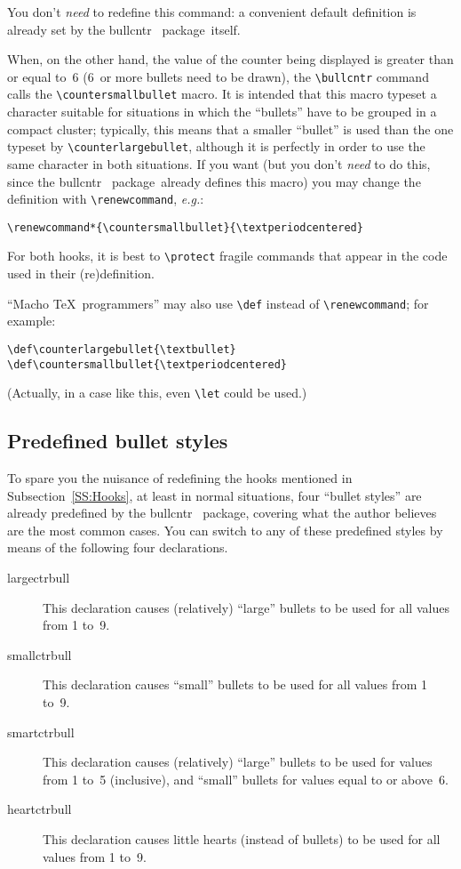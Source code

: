 \documentclass[a4paper]{article}
\DeclareRobustCommand*{\command}[1]{%
	{\texorpdfstring{\normalfont\ttfamily \char\escapechar}{\pdfbslash}#1}%
}
\DeclareRobustCommand*{\packlass}[1]{%
	{\texorpdfstring{\normalfont \sffamily}{}#1}%
}
\newcommand*{\Bullcntr}{bullcntr}
\newcommand*{\bull}{\packlass{\Bullcntr}}
\newcommand*{\tbull}{the \bull\ package}
\newcommand*{\pdfbslash}{}
{\catcode`\|=0 |catcode`|\=12 |gdef|pdfbslash{\\}}
\begin{document}
You don't \emph{need} to redefine this command: a convenient default
definition is already set by \tbull\ itself.

When, on the other hand, the value of the counter being displayed is
greater than or equal to~6 (6~or more bullets need to be drawn), the
\verb|\bullcntr| command calls the \verb|\countersmallbullet| macro.
It is intended that this macro typeset a character suitable for
situations in which the ``bullets'' have to be grouped in a compact
cluster; typically, this means that a smaller ``bullet'' is used than
the one typeset by \verb|\counterlargebullet|, although it is
perfectly in order to use the same character in both situations.  If
you want (but you don't \emph{need} to do this, since \tbull\ already
defines this macro) you may change the definition with
\verb|\renewcommand|, \emph{e.g.}:
%
\begin{verbatim}
\renewcommand*{\countersmallbullet}{\textperiodcentered}
\end{verbatim}
%

For both hooks, it is best to \verb|\protect| fragile commands that
appear in the code used in their (re)definition.

``Macho \TeX\ programmers'' may also use \verb|\def| instead of
\verb|\renewcommand|; for example:
%
\begin{verbatim}
\def\counterlargebullet{\textbullet}
\def\countersmallbullet{\textperiodcentered}
\end{verbatim}
%
(Actually, in a case like this, even \verb|\let| could be used.)



\subsection{Predefined bullet styles}
\label{SS:BullStyl}

To spare you the nuisance of redefining the hooks mentioned in
Subsection~\ref{SS:Hooks}, at least in normal situations, four
``bullet styles'' are already predefined by \tbull, covering what the
author believes are the most common cases.  You can switch to any of
these predefined styles by means of the following four declarations.

\begin{description}

\item[\command{largectrbull}]
This declaration causes (relatively) ``large'' bullets to be used for
all values from 1 to~9.

\item[\command{smallctrbull}]
This declaration causes ``small'' bullets to be used for all values
from 1 to~9.

\item[\command{smartctrbull}]
This declaration causes (relatively) ``large'' bullets to be used for
values from 1 to~5 (inclusive), and ``small'' bullets for values equal
to or above~6.

\item[\command{heartctrbull}]
This declaration causes little hearts (instead of bullets) to be used
for all values from 1 to~9.

\end{description}
\end{document}
